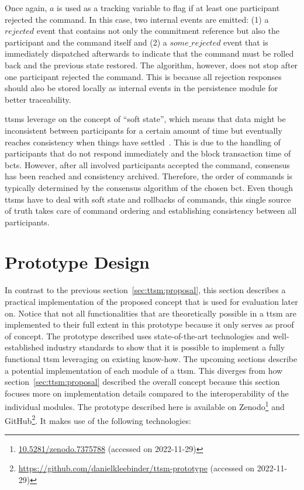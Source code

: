Once again, $a$ is used as a tracking variable to flag if at least one participant rejected the command. In this case, two internal events are emitted: (1) a $rejected$ event that contains not only the commitment reference but also the participant and the command itself and (2) a $some\_rejected$ event that is immediately dispatched afterwards to indicate that the command must be rolled back and the previous state restored. The algorithm, however, does not stop after one participant rejected the command. This is because all rejection responses should also be stored locally as internal events in the persistence module for better traceability.

\glspl{ttsm} leverage on the concept of ``soft state'', which means that data might be inconsistent between participants for a certain amount of time but eventually reaches consistency when things have settled~\cite{vogels2009_eventually_consistent}. This is due to the handling of participants that do not respond immediately and the block transaction time of \glspl{bct}. However, after all involved participants accepted the command, consensus has been reached and consistency archived. Therefore, the order of commands is typically determined by the consensus algorithm of the chosen \gls{bct}. Even though \glspl{ttsm} have to deal with soft state and rollbacks of commands, this single source of truth takes care of command ordering and establishing consistency between all participants.



\section{Prototype Design}
\label{sec:ttsm:prototype}
In contrast to the previous section~\ref{sec:ttsm:proposal}, this section describes a practical implementation of the proposed concept that is used for evaluation later on. Notice that not all functionalities that are theoretically possible in a \gls{ttsm} are implemented to their full extent in this prototype because it only serves as proof of concept. The prototype described uses state-of-the-art technologies and well-established industry standards to show that it is possible to implement a fully functional \gls{ttsm} leveraging on existing know-how. The upcoming sections describe a potential implementation of each module of a \gls{ttsm}. This diverges from how section~\ref{sec:ttsm:proposal} described the overall concept because this section focuses more on implementation details compared to the interoperability of the individual modules. The prototype described here is available on Zenodo\footnote{\href{https://zenodo.org/badge/latestdoi/521292268}{10.5281/zenodo.7375788} (accessed on 2022-11-29)} and GitHub\footnote{\url{https://github.com/danielkleebinder/ttsm-prototype} (accessed on 2022-11-29)}. It makes use of the following technologies:

